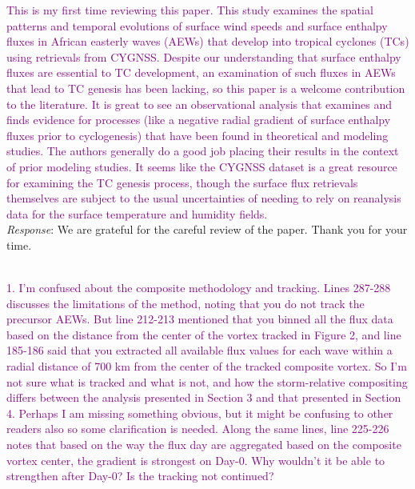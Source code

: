 \documentclass[10pt, letterpaper]{article}
\begin{document}
\textcolor{purple}{This is my first time reviewing this paper. This study examines the spatial patterns and temporal evolutions of surface wind speeds and surface enthalpy fluxes in African easterly waves (AEWs) that develop into tropical cyclones (TCs) using retrievals from CYGNSS. Despite our understanding that surface enthalpy fluxes are essential to TC development, an examination of such fluxes in AEWs that lead to TC genesis has been lacking, so this paper is a welcome contribution to the literature. It is great to see an observational analysis that examines and finds evidence for processes (like a negative radial gradient of surface enthalpy fluxes prior to cyclogenesis) that have been found in theoretical and modeling studies. The authors generally do a good job placing their results in the context of prior modeling studies. It seems like the CYGNSS dataset is a great resource for examining the TC genesis process, though the surface flux retrievals themselves are subject to the usual uncertainties of needing to rely on reanalysis data for the surface temperature and humidity fields.}\\


\noindent \emph{Response}: We are grateful for the careful review of the paper. Thank you for your time.


\vspace{.25in}


\\


\textcolor{purple}{1. I'm confused about the composite methodology and tracking. Lines 287-288 discusses the limitations of the method, noting that you do not track the precursor AEWs. But line 212-213 mentioned that you binned all the flux data based on the distance from the center of the vortex tracked in Figure 2, and line 185-186 said that you extracted all available flux values for each wave within a radial distance of 700 km from the center of the tracked composite vortex. So I'm not sure what is tracked and what is not, and how the storm-relative compositing differs between the analysis presented in Section 3 and that presented in Section 4. Perhaps I am missing something obvious, but it might be confusing to other readers also so some clarification is needed. Along the same lines, line 225-226 notes that based on the way the flux day are aggregated based on the composite vortex center, the gradient is strongest on Day-0. Why wouldn't it be able to strengthen after Day-0? Is the tracking not continued?} \\
\end{document}
